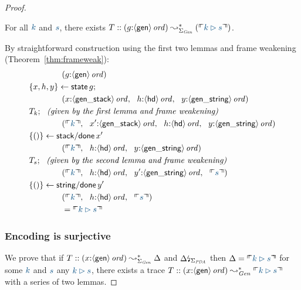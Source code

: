 \begin{proof}
\begin{lemma} For all $\obj{k}$ and $\obj{s}$, there exists
$T :: ({g{:}\istrue{\susp{\sf gen}}}) \leadsto^*_{\Sigma_{\it Gen}} 
(\ctxinterp{k \rhd s})$. 
\end{lemma}
\noindent
By straightforward construction using the first two lemmas
and frame weakening (Theorem~\ref{thm:frameweak}): 
\begin{align*}
& \qquad\qquad (g{:}\istrue{\susp{\sf gen}})\\
& \trstep{x,h,y}{{\sf state}\,g};\\
& \qquad\qquad
       (x{:}\istrue{\susp{\sf gen\_stack}},  ~~
        h{:}\istrue{\susp{\sf hd}},~~ 
        y{:}\istrue{\susp{\sf gen\_string}})\\
& T_k; ~~ \mbox{\it (given by the first lemma and frame weakening)}\\
& \qquad\qquad
       (\ctxinterp{k},  ~~
        x'{:}\istrue{\susp{\sf gen\_stack}},  ~~
        h{:}\istrue{\susp{\sf hd}}, ~~
        y{:}\istrue{\susp{\sf gen\_string}})\\
& \trstep{()}{{\sf stack/done}\,x'}\\
& \qquad\qquad
       (\ctxinterp{k},  ~~
        h{:}\istrue{\susp{\sf hd}}, ~~
        y{:}\istrue{\susp{\sf gen\_string}})\\
& T_s; ~~ \mbox{\it (given by the second lemma and frame weakening)}\\
& \qquad\qquad
       (\ctxinterp{k}, ~~
        h{:}\istrue{\susp{\sf hd}}, ~~
        y'{:}\istrue{\susp{\sf gen\_string}}, ~~
        \ctxinterp{s})\\
& \trstep{()}{{\sf string/done}\,y'}\\
& \qquad\qquad 
       (\ctxinterp{k}, ~~
        h{:}\istrue{\susp{\sf hd}}, ~~
        \ctxinterp{s}) \\
& \qquad\qquad = \ctxinterp{k \rhd s}
\end{align*}


\subsubsection{Encoding is surjective}

We prove that if $T :: (x{:}{\langle {\sf gen} \rangle}\,{{\it ord}}) \leadsto^*_{\Sigma_{\it
    Gen}} \Delta$ and ${\Delta}{\mbox{\lightning}}_{\Sigma_{\it PDA}}$ then
$\Delta = \ctxinterp{k \rhd s}$ for some $\obj{k}$ and $\obj{s}$
any $\obj{k \rhd s}$, there exists a trace $T ::
(x{:}\istrue{\susp{\sf gen}}) \leadsto^*_{\it Gen} \ctxinterp{k \rhd
  s}$ with a series of two lemmas.


\end{proof}
